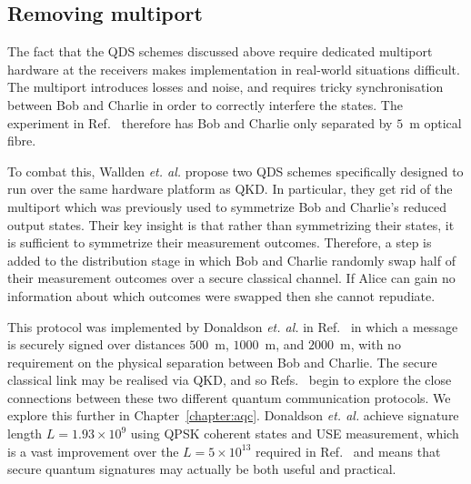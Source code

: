 
\subsection{Removing multiport}

The fact that the QDS schemes discussed above require dedicated multiport hardware at the receivers makes implementation in real-world situations difficult. The multiport introduces losses and noise, and requires tricky synchronisation between Bob and Charlie in order to correctly interfere the states. The experiment in Ref.~\cite{Collins2014} therefore has Bob and Charlie only separated by $5$~m optical fibre. 

To combat this, Wallden \emph{et. al.} \cite{Wallden2015} propose two QDS schemes specifically designed to run over the same hardware platform as QKD. In particular, they get rid of the multiport which was previously used to symmetrize Bob and Charlie's reduced output states. Their key insight is that rather than symmetrizing their states, it is sufficient to symmetrize their measurement outcomes. Therefore, a step is added to the distribution stage in which Bob and Charlie randomly swap half of their measurement outcomes over a secure classical channel. If Alice can gain no information about which outcomes were swapped then she cannot repudiate. 

This protocol was implemented by Donaldson \emph{et. al.} in Ref.~\cite{Donaldson2016} in which a message is securely signed over distances $500$~m, $1000$~m, and $2000$~m, with no requirement on the physical separation between Bob and Charlie. The secure classical link may be realised via QKD, and so Refs.~\cite{Wallden2015, Donaldson2016} begin to explore the close connections between these two different quantum communication protocols. We explore this further in Chapter~\ref{chapter:aqc}. Donaldson \emph{et. al.} achieve signature length $L = 1.93 \times 10^9$ using QPSK coherent states and USE measurement, which is a vast improvement over the $L = 5 \times 10^{13}$ required in Ref.~\cite{Collins2014} and means that secure quantum signatures may actually be both useful and practical. 

